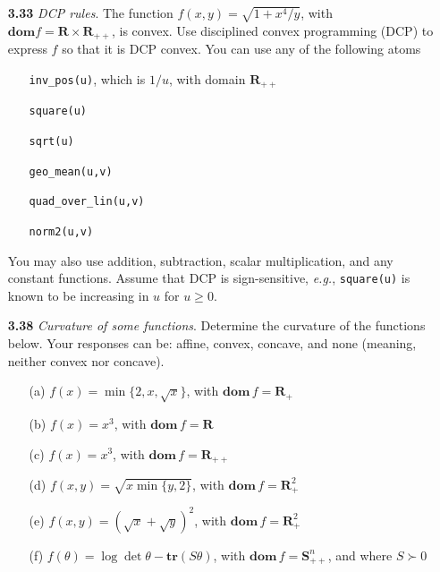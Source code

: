 \documentclass[11pt,a4paper]{article}
\begin{document}
\begin{itemize}
    \item[\textbf{3.33}] \textit{DCP rules}. The function $f(x,y) = \sqrt{1 + x^4/y}$, with $\textbf{dom} f = \mathbf{R}\times\mathbf{R}_{++}$, is convex. Use disciplined convex programming (DCP) to express $f$ so that it is DCP convex. You can use any of the following atoms
    \item[]\begin{itemize}
        \item[] \texttt{inv\_pos(u)}, which is $1/u$, with domain $\mathbf{R}_{++}$
        \item[] \texttt{square(u)}
        \item[] \texttt{sqrt(u)}
        \item[] \texttt{geo\_mean(u,v)}
        \item[] \texttt{quad\_over\_lin(u,v)}
        \item[] \texttt{norm2(u,v)}
    \end{itemize}

    You may also use addition, subtraction, scalar multiplication, and any constant functions. Assume that DCP is sign-sensitive, \textit{e.g.}, \texttt{square(u)} is known to be increasing in $u$ for $u \geq 0$.

    \item[\textbf{3.38}] \textit{Curvature of some functions}. Determine the curvature of the functions below. Your responses can be: affine, convex, concave, and none (meaning, neither convex nor concave).
    \item[] \begin{itemize}
        \item[(a)] $f(x) = \min\{2,x,\sqrt{x}\}$, with $\textbf{dom}\, f = \mathbf{R}_+$
        \item[(b)] $f(x) = x^3$, with $\textbf{dom} \, f = \mathbf{R}$
        \item[(c)] $f(x) = x^3$, with $\textbf{dom} \, f = \mathbf{R}_{++}$
        \item[(d)] $f(x,y) = \sqrt{x \min\{y,2\}}$, with $\mathbf{dom} \, f = \mathbf{R}_+^2$
        \item[(e)] $f(x,y) = (\sqrt{x} + \sqrt{y})^2$, with $\textbf{dom} \, f = \mathbf{R}_+^2$
        \item[(f)] $f(\theta) = \log \det \theta - \textbf{tr}(S\theta)$, with $\textbf{dom} \, f = \mathbf{S}_{++}^n$, and where $S \succ 0$
    \end{itemize}


\end{itemize}
\end{document}
